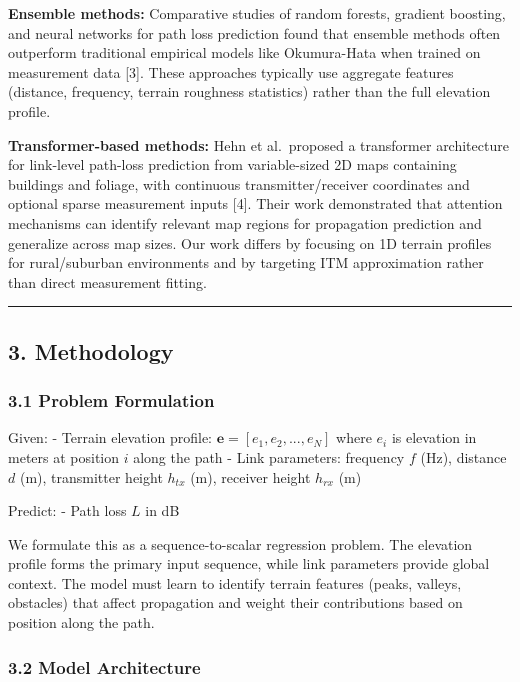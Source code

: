 \documentclass[
]{article}
\begin{document}
\textbf{Ensemble methods:} Comparative studies of random forests,
gradient boosting, and neural networks for path loss prediction found
that ensemble methods often outperform traditional empirical models like
Okumura-Hata when trained on measurement data {[}3{]}. These approaches
typically use aggregate features (distance, frequency, terrain roughness
statistics) rather than the full elevation profile.

\textbf{Transformer-based methods:} Hehn et al.~proposed a transformer
architecture for link-level path-loss prediction from variable-sized 2D
maps containing buildings and foliage, with continuous
transmitter/receiver coordinates and optional sparse measurement inputs
{[}4{]}. Their work demonstrated that attention mechanisms can identify
relevant map regions for propagation prediction and generalize across
map sizes. Our work differs by focusing on 1D terrain profiles for
rural/suburban environments and by targeting ITM approximation rather
than direct measurement fitting.

\begin{center}\rule{0.5\linewidth}{0.5pt}\end{center}

\subsection{3. Methodology}\label{methodology}

\subsubsection{3.1 Problem Formulation}\label{problem-formulation}

Given: - Terrain elevation profile:
\(\mathbf{e} = [e_1, e_2, ..., e_N]\) where \(e_i\) is elevation in
meters at position \(i\) along the path - Link parameters: frequency
\(f\) (Hz), distance \(d\) (m), transmitter height \(h_{tx}\) (m),
receiver height \(h_{rx}\) (m)

Predict: - Path loss \(L\) in dB

We formulate this as a sequence-to-scalar regression problem. The
elevation profile forms the primary input sequence, while link
parameters provide global context. The model must learn to identify
terrain features (peaks, valleys, obstacles) that affect propagation and
weight their contributions based on position along the path.

\subsubsection{3.2 Model Architecture}\label{model-architecture}
\end{document}
